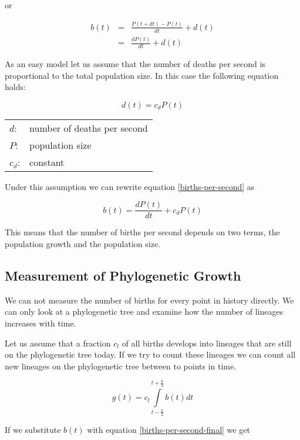 or

\begin{eqnarray}
b(t) & = & \frac{P(t+dt)- P(t)}{dt} + d(t)\\
     & = & \frac{dP(t)}{dt} + d(t) \label{births-per-second}
\end{eqnarray}

As an easy model let us assume that the number of deaths
per second is proportional to the total population size.
In this case the following equation holds:

\begin{equation}
d(t) = c_{d} P(t)
\end{equation}

\begin{tabular}{ll}
$d$:     & number of deaths per second\\
$P$:     & population size\\
$c_{d}$: & constant
\end{tabular}
\vspace{1em}

Under this assumption we can rewrite equation \ref{births-per-second}
as

\begin{equation}
b(t) = \frac{dP(t)}{dt} + c_{d} P(t)
\label{births-per-second-final}
\end{equation}

This means that the number of births per second depends on
two terms, the population growth and the population size.


\subsection{Measurement of Phylogenetic Growth}

We can not measure the number of births for every point in
history directly. We can only look at a phylogenetic tree
and examine how the number of lineages increases with time.

Let us assume that a fraction $c_l$ of all births develops
into lineages that are still on the phylogenetic tree today.
If we try to count these lineages we can count all new lineages
on the phylogenetic tree between to points in time.

\begin{equation}
g(t) = c_l \int\limits_{t-\frac{a}{2}}^{t+\frac{a}{2}} b(t) dt
\end{equation}

If we substitute $b(t)$ with equation \ref{births-per-second-final}
we get

